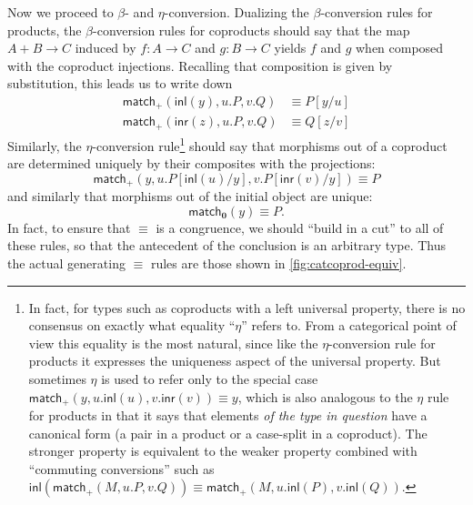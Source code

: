 \documentclass{book}
\def\inl{\mathsf{inl}}
\def\inr{\mathsf{inr}}
\def\case{\mathsf{match}_+}
\def\match{\mathsf{match}}
\def\zero{\mathbf{0}}
\def\abort{\match_{\zero}}
\begin{document}
Now we proceed to $\beta$- and $\eta$-conversion.
Dualizing the $\beta$-conversion rules for products, the $\beta$-conversion rules for coproducts should say that the map $A+B\to C$ induced by $f:A\to C$ and $g:B\to C$ yields $f$ and $g$ when composed with the coproduct injections.
Recalling that composition is given by substitution, this leads us to write down
\begin{align*}
  \case(\inl(y),u.P,v.Q) &\equiv P[y/u]\\
  \case(\inr(z),u.P,v.Q) &\equiv Q[z/v]
\end{align*}
Similarly, the $\eta$-conversion rule\footnote{In fact, for types such as coproducts with a left universal property, there is no consensus on exactly what equality ``$\eta$'' refers to.\label{fn:weak-eta}
  From a categorical point of view this equality is the most natural, since like the $\eta$-conversion rule for products it expresses the uniqueness aspect of the universal property.
  But sometimes $\eta$ is used to refer only to the special case $\case(y,u.\inl(u),v.\inr(v))\equiv y$, which is also analogous to the $\eta$ rule for products in that it says that elements \emph{of the type in question} have a canonical form (a pair in a product or a case-split in a coproduct).
  The stronger property is equivalent to the weaker property combined with ``commuting conversions'' such as $\inl(\case(M,u.P,v.Q)) \equiv \case(M,u.\inl(P),v.\inl(Q))$.%
} should say that morphisms out of a coproduct are determined uniquely by their composites with the projections:
\begin{equation}
  \case(y,u.P[\inl(u)/y],v.P[\inr(v)/y]) \equiv P\label{eq:catcoprod-eta}
\end{equation}
and similarly that morphisms out of the initial object are unique:
\[ \abort(y) \equiv P. \]
In fact, to ensure that $\equiv$ is a congruence, we should ``build in a cut'' to all of these rules, so that the antecedent of the conclusion is an arbitrary type.
Thus the actual generating $\equiv$ rules are those shown in \cref{fig:catcoprod-equiv}.
\end{document}
